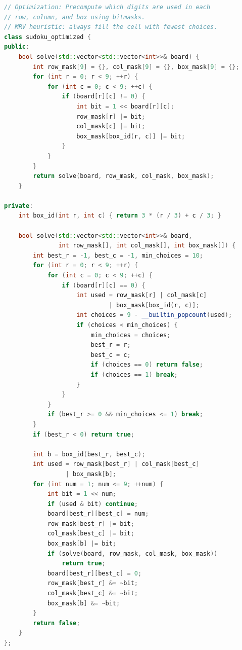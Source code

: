 \begin{lstlisting}[language=C++]
// Optimization: Precompute which digits are used in each
// row, column, and box using bitmasks.
// MRV heuristic: always fill the cell with fewest choices.
class sudoku_optimized {
public:
    bool solve(std::vector<std::vector<int>>& board) {
        int row_mask[9] = {}, col_mask[9] = {}, box_mask[9] = {};
        for (int r = 0; r < 9; ++r) {
            for (int c = 0; c < 9; ++c) {
                if (board[r][c] != 0) {
                    int bit = 1 << board[r][c];
                    row_mask[r] |= bit;
                    col_mask[c] |= bit;
                    box_mask[box_id(r, c)] |= bit;
                }
            }
        }
        return solve(board, row_mask, col_mask, box_mask);
    }

private:
    int box_id(int r, int c) { return 3 * (r / 3) + c / 3; }

    bool solve(std::vector<std::vector<int>>& board,
               int row_mask[], int col_mask[], int box_mask[]) {
        int best_r = -1, best_c = -1, min_choices = 10;
        for (int r = 0; r < 9; ++r) {
            for (int c = 0; c < 9; ++c) {
                if (board[r][c] == 0) {
                    int used = row_mask[r] | col_mask[c]
                             | box_mask[box_id(r, c)];
                    int choices = 9 - __builtin_popcount(used);
                    if (choices < min_choices) {
                        min_choices = choices;
                        best_r = r;
                        best_c = c;
                        if (choices == 0) return false;
                        if (choices == 1) break;
                    }
                }
            }
            if (best_r >= 0 && min_choices <= 1) break;
        }
        if (best_r < 0) return true;

        int b = box_id(best_r, best_c);
        int used = row_mask[best_r] | col_mask[best_c]
                 | box_mask[b];
        for (int num = 1; num <= 9; ++num) {
            int bit = 1 << num;
            if (used & bit) continue;
            board[best_r][best_c] = num;
            row_mask[best_r] |= bit;
            col_mask[best_c] |= bit;
            box_mask[b] |= bit;
            if (solve(board, row_mask, col_mask, box_mask))
                return true;
            board[best_r][best_c] = 0;
            row_mask[best_r] &= ~bit;
            col_mask[best_c] &= ~bit;
            box_mask[b] &= ~bit;
        }
        return false;
    }
};
\end{lstlisting}

